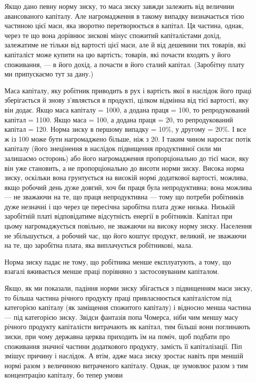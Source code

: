 Якщо дано певну норму зиску, то маса зиску завжди залежить
від величини авансованого капіталу. Але нагромадження
в такому випадку визначається тією частиною цієї маси, яка
зворотно перетворюється в капітал. Ця частина, однак, через
те що вона дорівнює зискові мінус спожитий капіталістами дохід,
залежатиме не тільки від вартості цієї маси, але й від дешевини
тих товарів, які капіталіст може купити на цю вартість;
товарів, які почасти входять у його споживання, — в його дохід,
а почасти в його сталий капітал. (Заробітну плату ми припускаємо
тут за дану.)

Маса капіталу, яку робітник приводить в рух і вартість якої
в наслідок його праці зберігається й знову з’являється в продукті,
цілком відмінна від тієї вартості, яку він додає. Якщо
маса капіталу = 1000, а додана праця = 100, то репродукований
капітал = 1100. Якщо маса = 100, а додана праця = 20, то
репродукований капітал = 120. Норма зиску в першому випадку
= 10\%, у другому = 20\%. І все ж із 100 може бути
нагромаджено більше, ніж з 20. І таким чином наростає потік
капіталу (його знецінення в наслідок підвищення продуктивної
сили ми залишаємо осторонь) або його нагромадження
пропорціонально до тієї маси, яку він уже становить, а не
пропорціонально до висоти норми зиску. Висока норма зиску,
оскільки вона грунтується на високій нормі додаткової вартості,
можлива, якщо робочий день дуже довгий, хоч би
праця була непродуктивна; вона можлива — не зважаючи на
те, що праця непродуктивна — тому що потреби робітників
дуже незначні і що через це пересічна заробітна плата дуже
низька. Низькій заробітній платі відповідатиме відсутність енергії
в робітників. Капітал при цьому нагромаджується повільно,
не зважаючи на високу норму зиску. Населення не збільшується,
а робочий час, що його коштує продукт, великий, не зважаючи
на те, що заробітна плата, яка виплачується робітникові,
мала.

Норма зиску падає не тому, що робітника менше експлуатують,
а тому, що взагалі вживається менше праці порівняно
з застосовуваним капіталом.

Якщо, як ми показали, падіння норми зиску збігається з підвищенням
маси зиску, то більша частина річного продукту праці
привласнюється капіталістом під категорією капіталу (як заміщення
спожитого капіталу) і відносно менша частина — під категорією
зиску. Звідси фантазія попа Чомерса, ніби чим меншу масу річного
продукту капіталісти витрачають як капітал, тим більші
вони поглинають зиски, при чому державна церква приходить
їм на поміч, щоб подбати про споживання значної частини додаткового
продукту, замість її капіталізації. Піп змішує причину
і наслідок. А втім, адже маса зиску зростає навіть при меншій
нормі разом з величиною витраченого капіталу. Однак, це зумовлює
разом з тим концентрацію капіталу, бо тепер умови
\parbreak{}  %
